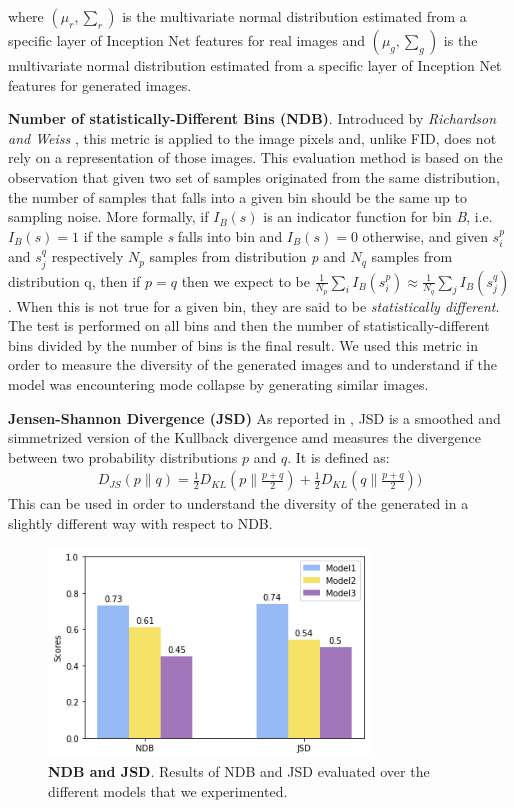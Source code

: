 \documentclass[10pt,twocolumn,letterpaper]{article}
\begin{document}
where $\textstyle (\mu_{r} , \sum_{r})$ is the multivariate normal distribution estimated from a specific layer of Inception Net features for real images and $\textstyle (\mu_{g} , \sum_{g})$ is the multivariate normal distribution estimated from a specific layer of Inception Net features for generated images. 

\textbf{Number of statistically-Different Bins (NDB)}. Introduced by \textit{Richardson and Weiss} \cite{ndb}, this metric is applied to the image pixels and, unlike FID, does not rely on a representation of those images. This evaluation method is based on the observation that given two set of samples originated from the same distribution, the number of samples that falls into a given bin should be the same up to sampling noise. More formally, if $I_{B}(s)$ is an indicator function for bin \textit{B}, i.e. $I_{B}(s)=1$ if the sample \textit{s} falls into bin  and $I_{B}(s)=0$ otherwise, and given ${s_{i}^{p}}$ and ${s_{j}^{q}}$ respectively ${N_{p}}$ samples from distribution \textit{p} and ${N_{q}}$ samples from distribution q, then if $p=q$ then we expect to be $\textstyle \frac{1}{N_p}\sum_{i}{I_B(s_{i}^{p})} \approx \frac{1}{N_q}\sum_{j}{I_B(s_{j}^{q})} $. When this is not true for a given bin, they are said to be \textit{statistically different}. The test is performed on all bins and then the number of statistically-different bins divided by the number of bins is the final result. We used this metric in order to measure the diversity of the generated images and to understand if the model was encountering mode collapse by generating similar images. 

\textbf{Jensen-Shannon Divergence (JSD)} As reported in \cite{jsd}, JSD is a smoothed and simmetrized version of the Kullback divergence amd measures the divergence between two probability distributions $p$ and $q$. It is defined as: 
\begin{equation}
	\begin{split}
		D_{JS}(p\|q) = \frac{1}{2}D_{KL}(p\|\frac{p+q}{2})+  \frac{1}{2}D_{KL}(q\|\frac{p+q}{2}))
	\end{split}
\end{equation}
This can be used in order to understand the diversity of the generated in a slightly different way with respect to NDB.


\begin{figure}
	\includegraphics[width=23em]{index.png}
	\caption{\textbf{NDB and JSD}. Results of NDB and JSD evaluated over the different models that we experimented.}
	\label{figure:ndb-jsd}
\end{figure}
\end{document}
